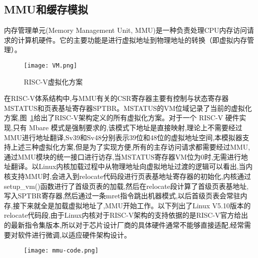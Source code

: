 \subsection{MMU和缓存模拟}

内存管理单元(Memory Management Unit, MMU)是一种负责处理CPU内存访问请求的计算机硬件。它的主要功能是进行虚拟地址到物理地址的转换（即虚拟内存管理）。
\begin{figure}[h]
    \centering
    \texttt{[image: VM.png]}
    \caption{RISC-V虚拟化方案}
    \label{fig:VM}
\end{figure}

在RISC-V体系结构中,与MMU有关的CSR寄存器主要有控制与状态寄存器MSTATUS和页表基址寄存器SPTBR。MSTATUS的VM位域记录了当前的虚拟化方案,图~\ref{fig:VM}给出了RISC-V架构定义的所有虚拟化方案。对于一个 RISC-V 硬件实现,只有 Mbare 模式是强制要求的,该模式下地址是直接映射,理论上不需要经过MMU进行地址翻译,Sv39和Sv48分别表示39位和48位的虚拟地址空间,本模拟器支持上述三种虚拟化方案,但是为了实现方便,所有的主存访问请求都需要经过MMU,通过MMU模块的统一接口进行访存,当MSTATUS寄存器VM位为0时,无需进行地址翻译。以Linux内核加载过程中从物理地址向虚拟地址过渡的逻辑可以看出,当内核支持MMU时,会进入到relocate代码段进行页表基地址寄存器的初始化,内核通过setup\_vm()函数进行了首级页表的加载,然后在relocate段计算了首级页表基地址,写入SPTBR寄存器,然后通过一条mret指令跳出机器模式,以后首级页表会常驻内存,接下来就全是加载虚拟地址了,MMU开始工作。以下列出了Linux V5.10版本的relocate代码段,由于Linux内核对于RISC-V架构的支持依据的是RISC-V官方给出的最新指令集版本,所以对于芯片设计厂商的具体硬件通常不能够直接适配,经常需要对软件进行微调,以适应硬件架构设计。
\begin{figure}[H]
    \centering
    \texttt{[image: mmu-code.png]}
    \label{fig:mmu-code}
\end{figure}
\vspace{-0.8cm} 
